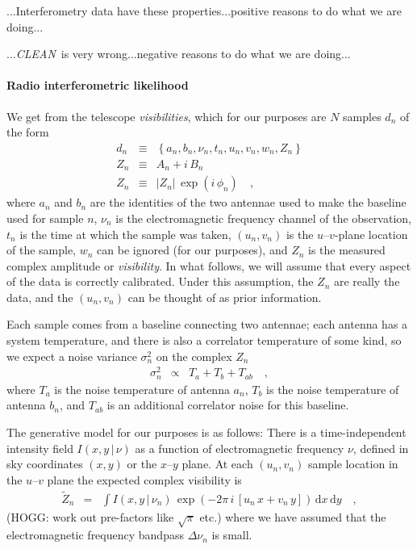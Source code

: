 \documentclass[12pt]{article}
\newcommand{\project}[1]{\textsl{#1}}
\newcommand{\CLEAN}{\project{CLEAN}}
\newcommand{\set}[1]{\left\{{#1}\right\}}
\newcommand{\given}{\,|\,}
\newcommand{\expectation}[1]{\tilde{#1}}
\newcommand{\dd}{\mathrm{d}}
\begin{document}
...Interferometry data have these properties...positive reasons to do
what we are doing...

...\CLEAN\ is very wrong...negative reasons to do what we are doing...

\paragraph{Radio interferometric likelihood}

We get from the telescope \emph{visibilities}, which for our purposes
are $N$ samples $d_n$ of the form
\begin{eqnarray}
d_n &\equiv& \set{a_n, b_n, \nu_n, t_n, u_n, v_n, w_n, Z_n}
\\
Z_n &\equiv& A_n + i\,B_n
\\
Z_n &\equiv& \left|Z_n\right|\,\exp(i\,\phi_n)
\quad,
\end{eqnarray}
where $a_n$ and $b_n$ are the identities of the two antennae used to
make the baseline used for sample $n$, $\nu_n$ is the electromagnetic
frequency channel of the observation, $t_n$ is the time at which the
sample was taken, $(u_n, v_n)$ is the $u$--$v$-plane location of the
sample, $w_n$ can be ignored (for our purposes), and $Z_n$ is the
measured complex amplitude or \emph{visibility}.  In what follows, we
will assume that every aspect of the data is correctly calibrated.
Under this assumption, the $Z_n$ are really the data, and the $(u_n,
v_n)$ can be thought of as prior information.

Each sample comes from a baseline connecting two antennae; each
antenna has a system temperature, and there is also a correlator
temperature of some kind, so we expect a noise variance $\sigma_n^2$
on the complex $Z_n$
\begin{eqnarray}
\sigma_n^2 &\propto& T_a + T_b + T_{ab}
\quad ,
\end{eqnarray}
where $T_a$ is the noise temperature of antenna $a_n$, $T_b$ is the
noise temperature of antenna $b_n$, and $T_{ab}$ is an additional
correlator noise for this baseline.

The generative model for our purposes is as follows: There is a
time-independent intensity field $I(x,y\given\nu)$ as a function of
electromagnetic frequency $\nu$, defined in sky coordinates $(x,y)$ or
the $x$--$y$ plane.  At each $(u_n, v_n)$ sample location in the
$u$--$v$ plane the expected complex visibility is
\begin{eqnarray}
\expectation{Z}_n &=& \int I(x,y\given\nu_n)\,\exp(-2\pi\,i\,[u_n\,x + v_n\,y])\,\dd x\,\dd y
\quad ,
\end{eqnarray}
(HOGG: work out pre-factors like $\sqrt{\pi}$ etc.) where we have
assumed that the electromagnetic frequency bandpass $\Delta\nu_n$ is
small.
\end{document}
